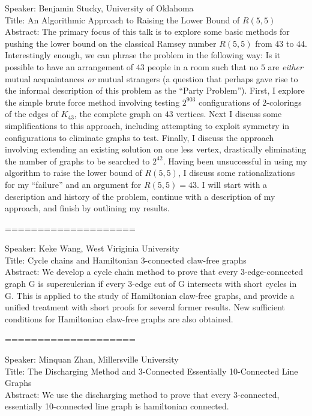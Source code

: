 \documentclass[11pt]{article}
\begin{document}
Speaker: Benjamin Stucky, University of Oklahoma\\
Title:  An Algorithmic Approach to Raising the Lower Bound of $R(5,5)$ \\
Abstract:  The primary focus of this talk is to explore some basic methods
for pushing the lower bound on the classical Ramsey number $R(5,5)$ from
$43$ to $44$.  Interestingly enough, we can phrase the problem in the
following way: Is it possible to have an arrangement of $43$ people in a
room such that no $5$ are \textit{either} mutual acquaintances \textit{or}
mutual strangers (a question that perhaps gave rise to the informal
description of this problem as the ``Party Problem'').  First, I explore the
simple brute force method involving testing $2^{903}$ configurations of
$2$-colorings of the edges of $K_{43}$, the complete graph on $43$ vertices.
Next I discuss some simplifications to this approach, including attempting
to exploit symmetry in configurations to eliminate graphs to test.  Finally,
I discuss the approach involving extending an existing solution on one less
vertex, drastically eliminating the number of graphs to be searched to
$2^{42}$. Having been unsuccessful in using my algorithm to raise the lower
bound of $R(5,5)$, I discuss some rationalizations for my ``failure'' and an
argument for $R(5,5)=43$. I will start with a description and history of the
problem, continue with a description of my approach, and finish by outlining
my results. 




====================

Speaker: Keke Wang, West Viriginia University\\
Title: Cycle chains and Hamiltonian 3-connected claw-free graphs\\
Abstract: We develop a cycle chain method to prove that every
3-edge-connected graph G is supereulerian if every 3-edge cut of G
intersects with short cycles in G. This is applied to the study of
Hamiltonian claw-free graphs, and provide a unified treatment with short
proofs for several former results. New sufficient conditions for Hamiltonian
claw-free graphs are also obtained. 

====================



Speaker: Minquan Zhan, Millersville University\\
Title: The Discharging Method and 3-Connected Essentially 10-Connected Line
Graphs \\
Abstract: We use the discharging method to prove that every 3-connected,
essentially 10-connected line graph is hamiltonian connected. 
\end{document}
